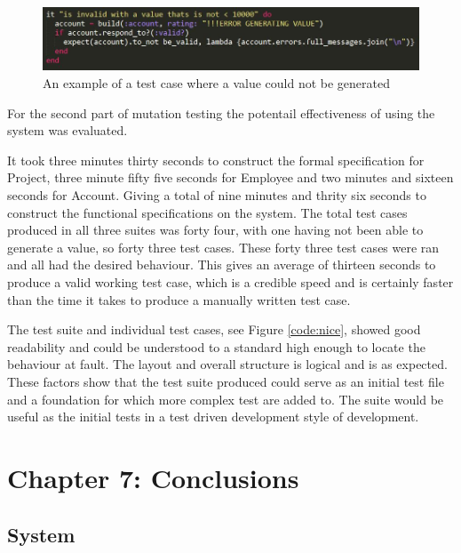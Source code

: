 \documentclass[a4paper,12pt]{article}
\begin{document}
\begin{figure}
\includegraphics[width=\linewidth]{screenshots/rspecfailcode}
\caption{An example of a test case where a value could not be generated}
\label{fig:rspecfailcode}
\end{figure}

\par For the second part of mutation testing the potentail effectiveness of using the system was evaluated.
\vspace{3mm}
\par It took three minutes thirty seconds to construct the formal specification for Project, three minute fifty five seconds for Employee and two minutes and sixteen seconds for Account. Giving a total of nine minutes and thrity six seconds to construct the functional specifications on the system. The total test cases produced in all three suites was forty four, with one having not been able to generate a value, so forty three test cases. These forty three test cases  were ran and all had the desired behaviour. This gives an average of thirteen seconds to produce a valid working test case, which is a credible speed and is certainly faster than the time it takes to produce a manually written test case.
\vspace{3mm}
\par The test suite and individual test cases, see Figure \ref{code:nice}, showed good readability and could be understood to a standard high enough to locate the behaviour at fault. The layout and overall structure is logical and is as expected. These factors show that the test suite produced could serve as an initial test file and a foundation for which more complex test are added to. The suite would be useful as the initial tests in a test driven development style of development.


\section{Chapter 7: Conclusions}

\subsection{System}
\end{document}
